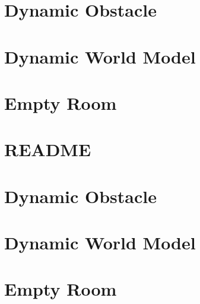 \let\mypdfximage\pdfximage\def\pdfximage{\immediate\mypdfximage}\documentclass[twoside]{book}
\newcommand{\+}{\discretionary{\mbox{\scriptsize$\hookleftarrow$}}{}{}}
\begin{document}
\chapter{Dynamic Obstacle}
\label{md_smacc2_sm_reference_library_sm_dance_bot_models_dynamic_obstacle_README}

\chapter{Dynamic World Model}
\label{md_smacc2_sm_reference_library_sm_dance_bot_models_dynamic_world_README}

\chapter{Empty Room}
\label{md_smacc2_sm_reference_library_sm_dance_bot_models_empty_room_README}

\chapter{README}
\label{md_smacc2_sm_reference_library_sm_dance_bot_README}

\chapter{Dynamic Obstacle}
\label{md_smacc2_sm_reference_library_sm_dance_bot_lite_models_dynamic_obstacle_README}

\chapter{Dynamic World Model}
\label{md_smacc2_sm_reference_library_sm_dance_bot_lite_models_dynamic_world_README}

\chapter{Empty Room}
\label{md_smacc2_sm_reference_library_sm_dance_bot_lite_models_empty_room_README}

\end{document}
